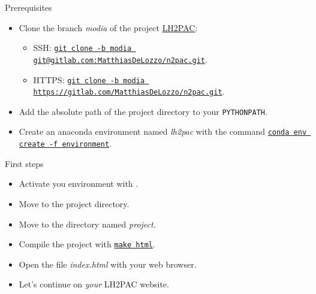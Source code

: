 \documentclass[aspectratio=169]{beamer}
\begin{document}
\begin{frame}{Prerequisites}
    \begin{itemize}
        \item Clone the branch \textit{modia} of the project \href{https://gitlab.com/MatthiasDeLozzo/n2pac/-/tree/modia}{LH2PAC}:
            \begin{itemize}
                \item SSH: \underline{\texttt{git clone -b modia git@gitlab.com:MatthiasDeLozzo/n2pac.git}}.
                \item HTTPS: \underline{\texttt{git clone -b modia https://gitlab.com/MatthiasDeLozzo/n2pac.git}}.
            \end{itemize}
        \item Add the absolute path of the project directory to your \texttt{PYTHONPATH}.
        \item Create an anaconda environment named \textit{lh2pac}
              with the command \underline{\texttt{conda env create -f environment}}.
    \end{itemize}
\end{frame}
\begin{frame}{First steps}
    \begin{itemize}
        \item Activate you environment with \underline{}.
        \item Move to the project directory.
        \item Move to the directory named \textit{project}.
        \item Compile the project with \underline{\texttt{make html}}.
        \item Open the file \textit{index.html} with your web browser.
        \item Let's continue on \textit{your} LH2PAC website.
    \end{itemize}
\end{frame}
\end{document}
